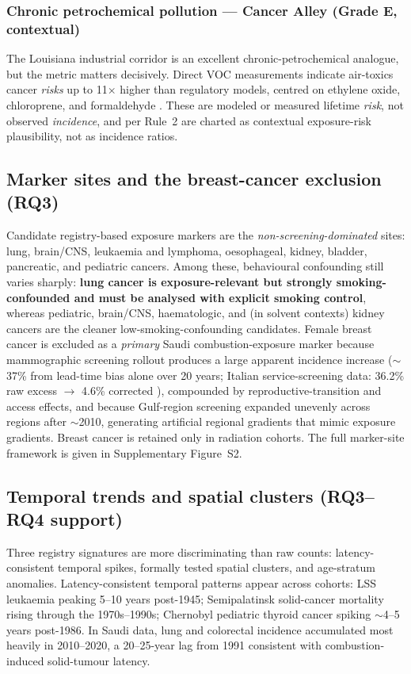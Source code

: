 \documentclass[3p,times]{elsarticle}
\begin{document}
\subsubsection{Chronic petrochemical pollution --- Cancer Alley (Grade E, contextual)}
The Louisiana industrial corridor is an excellent chronic-petrochemical analogue, but the metric matters decisively. Direct VOC measurements indicate air-toxics cancer \emph{risks} up to 11$\times$ higher than regulatory models, centred on ethylene oxide, chloroprene, and formaldehyde \citep{robinson2025,terrell2024,kweon}. These are modeled or measured lifetime \emph{risk}, not observed \emph{incidence}, and per Rule~2 are charted as contextual exposure-risk plausibility, not as incidence ratios.

\subsection{Marker sites and the breast-cancer exclusion (RQ3)}\label{sec:markers}
Candidate registry-based exposure markers are the \emph{non-screening-dominated} sites: lung, brain/CNS, leukaemia and lymphoma, oesophageal, kidney, bladder, pancreatic, and pediatric cancers. Among these, behavioural confounding still varies sharply: \textbf{lung cancer is exposure-relevant but strongly smoking-confounded and must be analysed with explicit smoking control}, whereas pediatric, brain/CNS, haematologic, and (in solvent contexts) kidney cancers are the cleaner low-smoking-confounding candidates. Female breast cancer is excluded as a \emph{primary} Saudi combustion-exposure marker because mammographic screening rollout produces a large apparent incidence increase ($\sim$37\% from lead-time bias alone over 20 years; Italian service-screening data: 36.2\% raw excess $\rightarrow$ 4.6\% corrected \citep{paci2006}), compounded by reproductive-transition and access effects, and because Gulf-region screening expanded unevenly across regions after $\sim$2010, generating artificial regional gradients that mimic exposure gradients. Breast cancer is retained only in radiation cohorts. The full marker-site framework is given in Supplementary Figure~S2.

\subsection{Temporal trends and spatial clusters (RQ3--RQ4 support)}
Three registry signatures are more discriminating than raw counts: latency-consistent temporal spikes, formally tested spatial clusters, and age-stratum anomalies. Latency-consistent temporal patterns appear across cohorts: LSS leukaemia peaking 5--10 years post-1945; Semipalatinsk solid-cancer mortality rising through the 1970s--1990s; Chernobyl pediatric thyroid cancer spiking $\sim$4--5 years post-1986. In Saudi data, lung and colorectal incidence accumulated most heavily in 2010--2020, a 20--25-year lag from 1991 consistent with combustion-induced solid-tumour latency.
\end{document}
